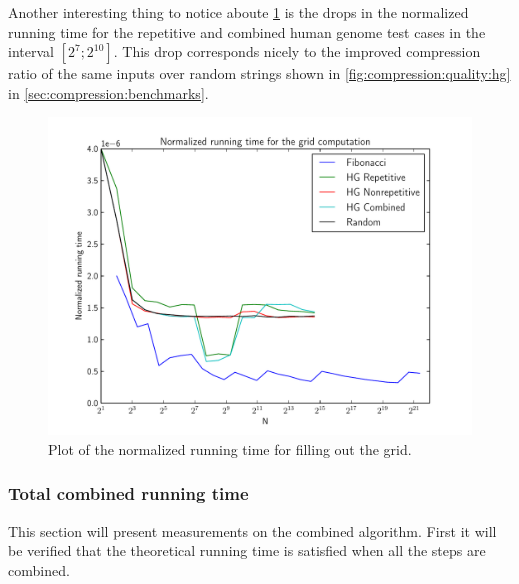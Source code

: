 \documentclass[twoside,11pt,openright]{report}
\begin{document}

Another interesting thing to notice aboute \cref{fig:benchmark:fill-grid-time} is the drops in the normalized running time for the repetitive and combined human genome test cases in the interval $[2^7; 2^{10}]$. This drop corresponds nicely to the improved compression ratio of the same inputs over random strings shown in \cref{fig:compression:quality:hg} in \cref{sec:compression:benchmarks}.

\begin{figure}[!htb]
  \centering
  \includegraphics[width=11.3cm]{combined/grid_runningtime}
  \caption{Plot of the normalized running time for filling out the grid.}
  \label{fig:benchmark:fill-grid-time}
\end{figure}


\clearpage
\subsubsection{Total combined running time}
This section will present measurements on the combined algorithm. First it will be verified that the theoretical running time is satisfied when all the steps are combined.
\end{document}
